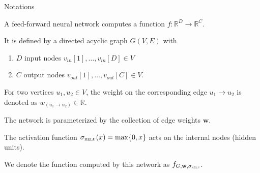 \documentclass[presentation,xcolor={usenames,dvipsnames},10pt]{beamer}
\newcommand{\vin}{v_{in}}
\newcommand{\vout}{v_{out}}
\newcommand{\relu}{\sigma_{\textsc{relu}}}
\begin{document}
\begin{frame}{Notations}

\begin{definition}
A feed-forward neural network computes a function $f:\mathbb{R}^D \rightarrow \mathbb{R}^C$.

It is defined by a directed acyclic graph $G(V,E)$ with 
\begin{enumerate} 
	\item $D$ input nodes
	$\vin[1],\dots,\vin[D]\in V$
	\item $C$ output nodes $\vout[1],\dots,
	\vout[C]\in V$.
\end{enumerate}

For two vertices $u_1,u_2 \in V$, the weight on the corresponding edge $u_1\rightarrow u_2$ is denoted as $w_{(u_1\rightarrow u_2)} \in \mathbb{R}$. 

The network is parameterized by the collection of edge weights $\mathbf{w}$.

The activation function
$\relu(x) = \max\{0,x\}$ acts on the internal nodes (hidden
units).

We denote the function computed by this network as
$f_{G,\mathbf{w},\relu}$. 
\end{definition}

\end{frame}
\end{document}
